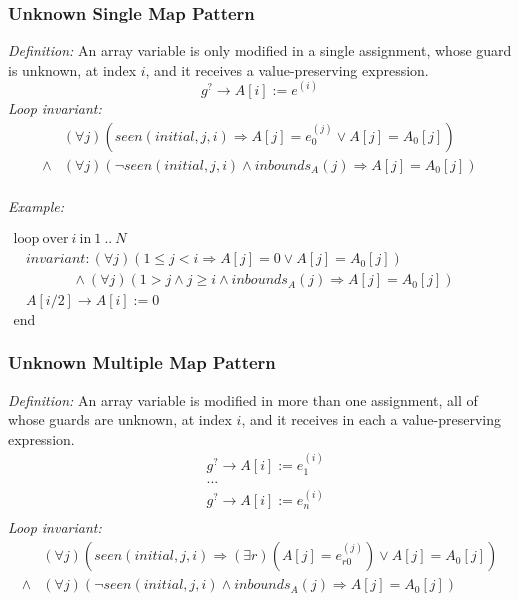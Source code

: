 \documentclass[a4paper,10pt]{article}
\newcommand{\idx}{\ensuremath{i}\xspace}
\newcommand{\idxinitial}{\ensuremath{\mathit{initial}}\xspace}
\newcommand{\at}[1]{{(#1)}}
\newcommand{\KWloop}{\ensuremath{\mathrm{loop}~}}
\newcommand{\KWend}{\ensuremath{\mathrm{end}~}}
\newcommand{\KWover}{\ensuremath{\mathrm{over}~}}
\newcommand{\KWin}{\ensuremath{~\mathrm{in}~}}
\newcommand{\impl}{\ensuremath{\Longrightarrow}}
\newcommand{\inbounds}[2]{\ensuremath{\mathit{inbounds}_{#1}(#2)}\xspace}
\newcommand{\seen}[3]{\ensuremath{\mathit{seen}{(#1,#2,#3)}}\xspace}
\newcommand{\loopinvariant}{\noindent\textit{Loop invariant:}\xspace}
\newcommand{\patterndef}{\noindent\textit{Definition:}\xspace}
\newcommand{\patternexample}{\noindent\textit{Example:}\xspace}
\begin{document}
\subsubsection*{Unknown Single Map Pattern}

\patterndef An array variable is only modified in a single assignment, whose
guard is unknown, at index \idx, and it receives a value-preserving expression.
%
$$g^? \rightarrow A[\idx] := e^\at{\idx}$$
%
\loopinvariant
%
\begin{eqnarray*}
&(\forall j)(\seen{\idxinitial}{j}{\idx} \impl A[j] = e_0^\at{j} \lor A[j] = A_0[j]) \\
\land&
 (\forall j)(\neg \seen{\idxinitial}{j}{\idx} \land \inbounds{A}{j} \impl A[j] = A_0[j])\\
\end{eqnarray*}

\bigskip
\patternexample

\medskip
$\begin{array}{l}
  \KWloop \KWover i \KWin 1~..~N \\
  ~~~~ \textit{invariant}: (\forall j)(1 \leq j < i \impl A[j] = 0 \lor A[j]=A_0[j])\\
  ~~~~~~~~~~~~~~~~~~~ \land (\forall j)(1 > j \land j \geq i \land \inbounds{A}{j} \impl A[j] = A_0[j])\\
  ~~~~ A[i/2] \rightarrow A[i] := 0\\
  \KWend
\end{array}$

\subsubsection*{Unknown Multiple Map Pattern}

\patterndef An array variable is modified in more than one assignment, all
of whose guards are unknown, at index \idx, and it receives in each a
value-preserving expression.
%
\begin{eqnarray*}
&g^? \rightarrow A[\idx] := e_1^\at{\idx}\\
&...\\
&g^? \rightarrow A[\idx] := e_n^\at{\idx}\\
\end{eqnarray*}
%
\loopinvariant
%
\begin{eqnarray*}
&(\forall j)(\seen{\idxinitial}{j}{\idx} \impl (\exists r)(A[j] = e_{r0}^\at{j}) \lor A[j] = A_0[j]) \\
\land&
 (\forall j)(\neg \seen{\idxinitial}{j}{\idx} \land \inbounds{A}{j} \impl A[j] = A_0[j])\\
\end{eqnarray*}
\end{document}
